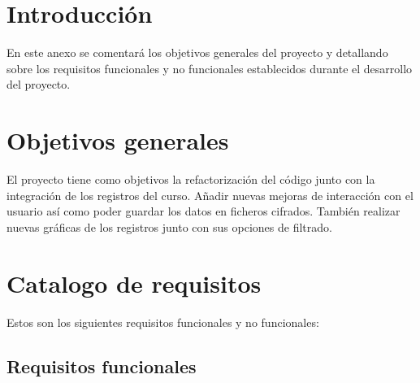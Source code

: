 
\section{Introducción}

En este anexo se comentará los objetivos generales del proyecto y detallando sobre los requisitos funcionales y no funcionales establecidos durante el desarrollo del proyecto.

\section{Objetivos generales}
El proyecto tiene como objetivos la refactorización del código junto con la integración de los registros del curso. Añadir nuevas mejoras de interacción con el usuario así como poder guardar los datos en ficheros cifrados. También realizar nuevas gráficas de los registros junto con sus opciones de filtrado.

\section{Catalogo de requisitos}

Estos son los siguientes requisitos funcionales y no funcionales:

\subsection{Requisitos funcionales}

